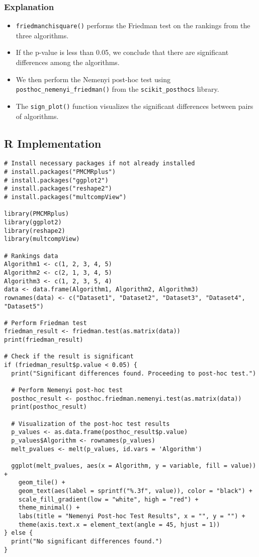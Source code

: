 \documentclass{article}
\begin{document}
\subsubsection*{Explanation}

\begin{itemize}
    \item \texttt{friedmanchisquare()} performs the Friedman test on the rankings from the three algorithms.
    \item If the p-value is less than 0.05, we conclude that there are significant differences among the algorithms.
    \item We then perform the Nemenyi post-hoc test using \texttt{posthoc\_nemenyi\_friedman()} from the \texttt{scikit\_posthocs} library.
    \item The \texttt{sign\_plot()} function visualizes the significant differences between pairs of algorithms.
\end{itemize}

\subsection*{R Implementation}

\begin{lstlisting}[style=rstyle, caption={R code for Friedman test and post-hoc analysis}]
# Install necessary packages if not already installed
# install.packages("PMCMRplus")
# install.packages("ggplot2")
# install.packages("reshape2")
# install.packages("multcompView")

library(PMCMRplus)
library(ggplot2)
library(reshape2)
library(multcompView)

# Rankings data
Algorithm1 <- c(1, 2, 3, 4, 5)
Algorithm2 <- c(2, 1, 3, 4, 5)
Algorithm3 <- c(1, 2, 3, 5, 4)
data <- data.frame(Algorithm1, Algorithm2, Algorithm3)
rownames(data) <- c("Dataset1", "Dataset2", "Dataset3", "Dataset4", "Dataset5")

# Perform Friedman test
friedman_result <- friedman.test(as.matrix(data))
print(friedman_result)

# Check if the result is significant
if (friedman_result$p.value < 0.05) {
  print("Significant differences found. Proceeding to post-hoc test.")
  
  # Perform Nemenyi post-hoc test
  posthoc_result <- posthoc.friedman.nemenyi.test(as.matrix(data))
  print(posthoc_result)
  
  # Visualization of the post-hoc test results
  p_values <- as.data.frame(posthoc_result$p.value)
  p_values$Algorithm <- rownames(p_values)
  melt_pvalues <- melt(p_values, id.vars = 'Algorithm')

  ggplot(melt_pvalues, aes(x = Algorithm, y = variable, fill = value)) +
    geom_tile() +
    geom_text(aes(label = sprintf("%.3f", value)), color = "black") +
    scale_fill_gradient(low = "white", high = "red") +
    theme_minimal() +
    labs(title = "Nemenyi Post-hoc Test Results", x = "", y = "") +
    theme(axis.text.x = element_text(angle = 45, hjust = 1))
} else {
  print("No significant differences found.")
}
\end{lstlisting}
\end{document}
